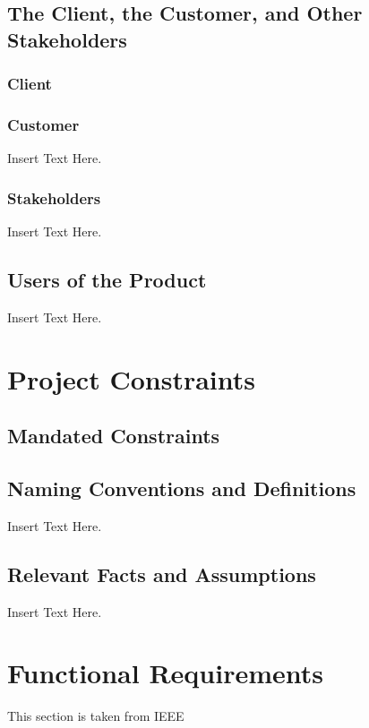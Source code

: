 \documentclass [12pt]{article}
\begin{document}
\subsection{The Client, the Customer, and Other Stakeholders}

\subsubsection{Client}
\lipsum[1]  %

\subsubsection{Customer}
 Insert Text Here.

\subsubsection{Stakeholders}
 Insert Text Here.

\subsection{Users of the Product} 
Insert Text Here.\\


\section{\textbf{Project Constraints}}


\subsection{Mandated Constraints}
\lipsum[1]  %
\subsection{Naming Conventions and Definitions}
	Insert Text Here.
	
\subsection{Relevant Facts and Assumptions} 
	Insert Text Here.



\section {Functional Requirements} 
This section is taken from IEEE
\end{document}
